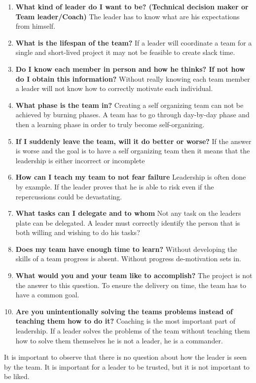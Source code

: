 \begin{enumerate}
\item \textbf{What kind of leader do I want to be? (Technical decision maker or Team leader/Coach)} The leader has to know what are his expectations from himself.
\item \textbf{What is the lifespan of the team?} If a leader will coordinate a team for a single and short-lived project it may not be feasible to create slack time.
\item \textbf{Do I know each member in person and how he thinks? If not how do I obtain this information?} Without really knowing each team member a leader will not know how to correctly motivate each individual.
\item \textbf{What phase is the team in?} Creating a self organizing team can not be achieved by burning phases. A team has to go through day-by-day phase and then a learning phase in order to truly become self-organizing.
\item \textbf{If I suddenly leave the team, will it do better or worse?} If the answer is worse and the goal is to have a self organizing team then it means that the leadership is either incorrect or incomplete
\item \textbf{How can I teach my team to not fear failure} Leadership is often done by example. If the leader proves that he is able to risk even if the repercussions could be devastating.
\item \textbf{What tasks can I delegate and to whom} Not any task on the leaders plate can be delegated. A leader must correctly identify the person that is both willing and wishing to do his tasks?
\item \textbf{Does my team have enough time to learn?} Without developing the skills of a team progress is absent. Without progress de-motivation sets in.
\item \textbf{What would you and your team like to accomplish?} The project is not the answer to this question. To ensure the delivery on time, the team has to have a common goal.
\item \textbf{Are you unintentionally solving the teams problems instead of teaching them how to do it?} Coaching is the most important part of leadership. If a leader solves the problems of the team without teaching them how to solve them themselves he is not a leader, he is a commander.
\end{enumerate}

It is important to observe that there is no question about how the leader is seen by the team. It is important for a leader to be trusted, but it is not important to be liked.

